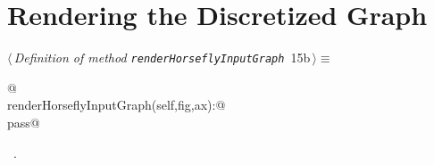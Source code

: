 \documentclass[11.5pt]{report}
\begin{document}
\section{Rendering the Discretized Graph}

\begin{flushleft} \small
\begin{minipage}{\linewidth}\label{scrap18}\raggedright\small
{} $\langle\,${\itshape Definition of method \verb|renderHorseflyInputGraph|}\nobreak\ {\footnotesize {15b}}$\,\rangle\equiv$
\vspace{-1ex}
\begin{list}{}{} \item
\mbox{}\verb@   @\\
\mbox{}\verb@def renderHorseflyInputGraph(self,fig,ax):@\\
\mbox{}\verb@    pass@\\
\mbox{}\verb@@{\NWsep}
\end{list}
\vspace{-1.5ex}
\footnotesize
\begin{list}{}{\setlength{\itemsep}{-\parsep}\setlength{\itemindent}{-\leftmargin}}
\item \NWtxtMacroRefIn\ .

\item{}
\end{list}
\end{minipage}\vspace{4ex}
\end{flushleft}
\end{document}

